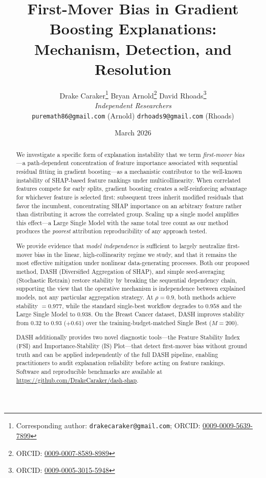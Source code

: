 \documentclass[11pt]{article}
\title{%
  \textbf{First-Mover Bias in Gradient Boosting Explanations:} \\[6pt]
  \large Mechanism, Detection, and Resolution
}
\author{
  Drake Caraker\thanks{Corresponding author: \texttt{drakecaraker@gmail.com}; ORCID: \href{https://orcid.org/0009-0009-5639-7899}{0009-0009-5639-7899}} \quad
  Bryan Arnold\thanks{ORCID: \href{https://orcid.org/0009-0007-8589-8989}{0009-0007-8589-8989}} \quad
  David Rhoads\thanks{ORCID: \href{https://orcid.org/0009-0005-3015-5948}{0009-0005-3015-5948}} \\[4pt]
  \textit{Independent Researchers} \\[2pt]
  \small\texttt{puremath86@gmail.com} (Arnold) \quad
  \small\texttt{drhoads9@gmail.com} (Rhoads)
}
\date{March 2026}
\newcommand{\dash}{\textsc{DASH}}
\newcommand{\rhovar}{\rho}
\begin{document}
\maketitle

\begin{abstract}
We investigate a specific form of explanation instability that we term
\emph{first-mover bias}---a path-dependent concentration of feature importance
associated with sequential residual fitting in gradient boosting---as a
mechanistic contributor to the well-known instability of SHAP-based feature
rankings under multicollinearity. When correlated features
compete for early splits, gradient boosting creates a self-reinforcing
advantage for whichever feature is selected first: subsequent trees inherit
modified residuals that favor the incumbent, concentrating SHAP importance on
an arbitrary feature rather than distributing it across the correlated group.
Scaling up a single model amplifies this effect---a Large Single Model with
the same total tree count as our method produces the \emph{poorest} attribution
reproducibility of any approach tested.

We provide evidence that \emph{model independence} is sufficient to largely
neutralize first-mover bias in the linear, high-collinearity regime we study,
and that it remains the most effective mitigation under nonlinear
data-generating processes. Both our proposed
method, \dash{} (Diversified Aggregation of SHAP), and simple seed-averaging
(Stochastic Retrain) restore stability by breaking the sequential dependency
chain, supporting the view that the operative mechanism is independence between
explained models, not any particular aggregation strategy. At $\rhovar = 0.9$, both methods achieve stability
$= 0.977$, while the standard
single-best workflow degrades to $0.958$ and the Large Single Model to
$0.938$. On the Breast Cancer dataset, \dash{} improves stability from
$0.32$ to $0.93$ ($+0.61$) over the training-budget-matched
Single Best ($M{=}200$).

\dash{} additionally provides two novel diagnostic tools---the Feature
Stability Index (FSI) and Importance-Stability (IS) Plot---that detect
first-mover bias without ground truth and can be applied independently
of the full \dash{} pipeline, enabling practitioners to audit
explanation reliability before acting on feature rankings. Software and
reproducible benchmarks are available at
\url{https://github.com/DrakeCaraker/dash-shap}.
\end{abstract}
\end{document}

